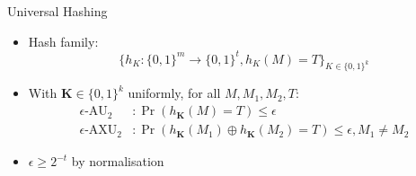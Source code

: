 \documentclass[xcolor=dvipsnames]{beamer}
\newcommand{\?}{\mathrel{?}} %
\newcommand{\rv}[1]{\boldsymbol{\mathbf{#1}}} %
\newcommand{\AU}{\mathrm{AU}_{2}}
\newcommand{\AXU}{\mathrm{AXU}_{2}}
\newcommand{\eAU}{\epsilon\text{-}\AU}
\newcommand{\eAXU}{\epsilon\text{-}\AXU}
\begin{document}
\begin{frame}{Universal Hashing}
  \begin{itemize}[<+->]
    \item Hash family:
      \[ {\{h_K : {\{0,1\}}^m \to {\{0,1\}}^t, h_K(M) = T \}}_{K \in {\{0,1\}}^k} \]
    \item With \(\rv{K} \in {\{0,1\}}^k\) uniformly, for all \(M, M_1, M_2, T\):
      \begin{align*}
        \eAU &: \Pr\left( h_{\rv{K}}(M) = T \right) \leq \epsilon \\
        \eAXU &: \Pr\left( h_{\rv{K}}(M_1) \oplus h_{\rv{K}}(M_2) = T \right) \leq \epsilon, M_1 \neq M_2
      \end{align*}
    \item \(\epsilon \geq 2^{-t}\) by normalisation
  \end{itemize}
\end{frame}
\end{document}
